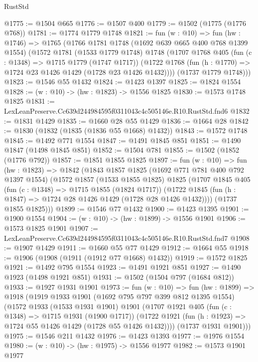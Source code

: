 \begin{lexlean}{RustStd}
\begin{coremodule}
@1775 := @1504 @665
@1776 := @1507 @400
@1779 := @1502 (@1775 (@1776 @768))
@1781 := @1774 @1779 @1748
@1821 := fun (w : @10) =>
  fun (hw : @1746) =>
  @1765
    (@1766
      @1781
      @1748
      (@1692 @639 @665 @400 @768 @1399 @1554)
      (@1572
        @1781
        (@1533 @1779 @1748)
        @1748
        (@1707
          @1768
          @405
          (fun (c : @1348) => @1715 @1779 (@1747 @1717))
          (@1722 @1768 (fun (h : @1770) => @1724 @23 @1426 @1429 (@1728 @23 @1426 @1432))))
        (@1737 @1779 @1748)))
@1823 := @1546 @55 @1432
@1824 := @1423 @1397
@1825 := @1824 @1554
@1828 := (w : @10) -> (hw : @1823) -> @1556 @1825
@1830 := @1573 @1748 @1825
@1831 := LexLeanPreserve.Cc639d244984595f0311043c4c505146e.R10.RustStd.fnd6
@1832 := @1831 @1429
@1835 := @1660 @28 @55 @1429
@1836 := @1664 @28
@1842 := @1830 (@1832 (@1835 (@1836 @55 @1668) @1432))
@1843 := @1572 @1748
@1845 := @1492 @771 @1554
@1847 := @1491 @1845 @851
@1851 := @1490 @1847 (@1498 @1845 @851)
@1852 := @1504 @781
@1855 := @1502 (@1852 (@1776 @792))
@1857 := @1851 @1855 @1825
@1897 := fun (w : @10) =>
  fun (hw : @1823) =>
  @1842
    (@1843
      @1857
      @1825
      (@1692 @771 @781 @400 @792 @1397 @1554)
      (@1572
        @1857
        (@1533 @1855 @1825)
        @1825
        (@1707
          @1845
          @405
          (fun (c : @1348) => @1715 @1855 (@1824 @1717))
          (@1722 @1845 (fun (h : @1847) => @1724 @28 @1426 @1429 (@1728 @28 @1426 @1432))))
        (@1737 @1855 @1825)))
@1899 := @1546 @77 @1432
@1900 := @1423 @1395
@1901 := @1900 @1554
@1904 := (w : @10) -> (hw : @1899) -> @1556 @1901
@1906 := @1573 @1825 @1901
@1907 := LexLeanPreserve.Cc639d244984595f0311043c4c505146e.R10.RustStd.fnd7
@1908 := @1907 @1429
@1911 := @1660 @55 @77 @1429
@1912 := @1664 @55
@1918 := @1906 (@1908 (@1911 (@1912 @77 @1668) @1432))
@1919 := @1572 @1825
@1921 := @1492 @795 @1554
@1923 := @1491 @1921 @851
@1927 := @1490 @1923 (@1498 @1921 @851)
@1931 := @1502 (@1504 @797 (@1684 @812))
@1933 := @1927 @1931 @1901
@1973 := fun (w : @10) =>
  fun (hw : @1899) =>
  @1918
    (@1919
      @1933
      @1901
      (@1692 @795 @797 @399 @812 @1395 @1554)
      (@1572
        @1933
        (@1533 @1931 @1901)
        @1901
        (@1707
          @1921
          @405
          (fun (c : @1348) => @1715 @1931 (@1900 @1717))
          (@1722 @1921 (fun (h : @1923) => @1724 @55 @1426 @1429 (@1728 @55 @1426 @1432))))
        (@1737 @1931 @1901)))
@1975 := @1546 @211 @1432
@1976 := @1423 @1393
@1977 := @1976 @1554
@1980 := (w : @10) -> (hw : @1975) -> @1556 @1977
@1982 := @1573 @1901 @1977

\end{coremodule}
\end{lexlean}
